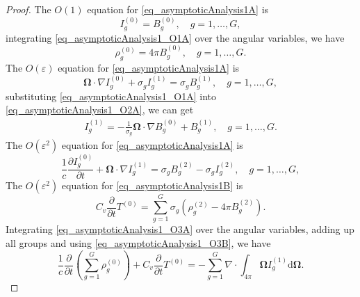 \documentclass[preprint,12pt]{elsarticle}
\theoremstyle{definition}
\theoremstyle{plain}
\numberwithin{equation}{section}
\numberwithin{algorithm}{section}
\newcounter{eq_count}
\newcommand{\vOmega}{\mathbf{\Omega}}
\newcommand{\dd}{{\text{d}}}
\begin{document}
\begin{proof}
    The $O(1)$ equation for \eqref{eq_asymptoticAnalysis1A} is
    \begin{equation}\label{eq_asymptoticAnalysis1_O1A}
        I_g^{(0)} = B_g^{(0)},  \quad g=1,\ldots,G, 
    \end{equation}
    integrating \eqref{eq_asymptoticAnalysis1_O1A} over the angular variables, we have 
    \begin{equation}\label{eq_asymptoticAnalysis1_O1B}
        \rho_g^{(0)} = 4 \pi B_g^{(0)},  \quad g=1,\ldots,G. 
    \end{equation}
    The $O(\varepsilon)$ equation for \eqref{eq_asymptoticAnalysis1A} is
    \begin{equation}\label{eq_asymptoticAnalysis1_O2A}
        \vOmega \cdot \nabla I_g^{(0)}  + \sigma_{g}I_g^{(1)} = \sigma_{g} B_g^{(1)} ,  \quad g=1,\ldots,G, 
    \end{equation}
    substituting \eqref{eq_asymptoticAnalysis1_O1A} into \eqref{eq_asymptoticAnalysis1_O2A}, we can get
    \begin{equation}\label{eq_asymptoticAnalysis1_O2B}
        \begin{aligned}
                I_g^{(1)} = - \frac{1}{ \sigma_g} \vOmega \cdot \nabla B_g^{(0)}+  B_g^{(1)},  \quad g=1,\ldots,G. 
        \end{aligned}
    \end{equation}
    The $O(\varepsilon^2)$ equation for \eqref{eq_asymptoticAnalysis1A} is
    \begin{equation}\label{eq_asymptoticAnalysis1_O3A}
        \frac{1}{c} \frac{\partial I_g^{(0)}}{\partial t}+\vOmega \cdot \nabla I_g^{(1)}  = \sigma_{g} B_g^{(2)} -\sigma_{g}I_g^{(2)},  \quad g=1,\ldots,G, 
    \end{equation}
        The $O(\varepsilon^2)$ equation for \eqref{eq_asymptoticAnalysis1B} is
    \begin{equation}\label{eq_asymptoticAnalysis1_O3B}
        C_v \frac{\partial }{\partial t}T^{(0)}=\sum_{g=1}^{G} \sigma_{g} \left( \rho_g^{(2)}- 4 \pi B_g^{(2)}  \right). 
    \end{equation}
    Integrating \eqref{eq_asymptoticAnalysis1_O3A} over the angular variables, adding up all groups and using \eqref{eq_asymptoticAnalysis1_O3B}, we have
    \begin{equation}\label{eq_asymptoticAnalysis1_O4}
        \frac{1}{c} \frac{\partial }{\partial t} \left( \sum_{g=1}^{G} \rho_g^{(0)} \right) + C_v \frac{\partial }{\partial t}T^{(0)}  
        = - \sum_{g=1}^{G} \nabla \cdot \int_{4 \pi} \vOmega I_g^{(1)} \dd{\vOmega}.

\end{equation}
\end{proof}
\end{document}
